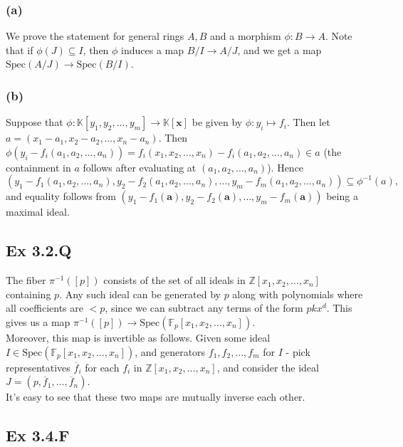 \documentclass{article}
\theoremstyle{definition}
\newcommand{\Z}{\mathbb{Z}}
\newcommand{\K}{\mathbb{K}}
\newcommand{\F}{\mathbb{F}}
\newcommand{\Kx}{\K[\bm{x}]}
\newcommand{\Spec}{\text{Spec}}
\newcommand{\spec}{\Spec}
\begin{document}
\subsubsection*{(a)}

We prove the statement for general rings $A, B$ and a morphism $\phi : B \to
A$. Note that if $\phi(J) \subseteq I$, then $\phi$ induces a map $B/I \to
A/J$, and we get a map $\spec(A/J) \to \spec(B/I)$.

\subsubsection*{(b)}

Suppose that $\phi : \K[y_1, y_2, \ldots, y_m] \to \Kx$ be given by $\phi : y_i
\mapsto f_i$. Then let $a = (x_1 - a_1, x_2 - a_2, \ldots, x_n - a_n)$. Then
$\phi(y_i - f_i(a_1, a_2, \ldots, a_n)) = f_i(x_1, x_2, \ldots, x_n) - f_i(a_1,
a_2, \ldots, a_n) \in a$ (the containment in $a$ follows after evaluating at
$(a_1, a_2, \ldots, a_n)$). Hence 
\[
	(y_1 - f_1(a_1, a_2, \ldots, a_n), y_2 - f_2(a_1, a_2, \ldots, a_n), \ldots, y_m - f_m(a_1, a_2, \ldots, a_n))
	\subseteq 
	\phi^{-1}(a),
\] 
and equality follows from $(y_1 - f_1(\bm{a}), y_2 - f_2(\bm{a}), \ldots, y_m -
f_m(\bm{a}))$ being a maximal ideal.

\subsection*{Ex 3.2.Q}

The fiber $\pi^{-1}([p])$ consists of the set of all ideals in $\Z[x_1, x_2,
\ldots, x_n]$ containing $p$. Any such ideal can be generated by $p$ along with
polynomials where all coefficients are $< p$, since we can subtract any terms
of the form $pk x^d$. This gives us a map $\pi^{-1}([p]) \to \spec(\F_p[x_1,
x_2, \ldots, x_n])$. \\

Moreover, this map is invertible as follows. Given some ideal $I \in
\spec(\F_p[x_1, x_2, \ldots, x_n])$, and generators $f_1, f_2, \ldots, f_m$ for
$I$ - pick representatives $\overline{f}_i$ for each $f_i$ in $\Z[x_1, x_2,
\ldots, x_n]$, and consider the ideal $J = (p, \overline{f}_1, \ldots,
\overline{f}_n)$. \\

It's easy to see that these two maps are mutually inverse each other.

\subsection*{Ex 3.4.F}
\end{document}
